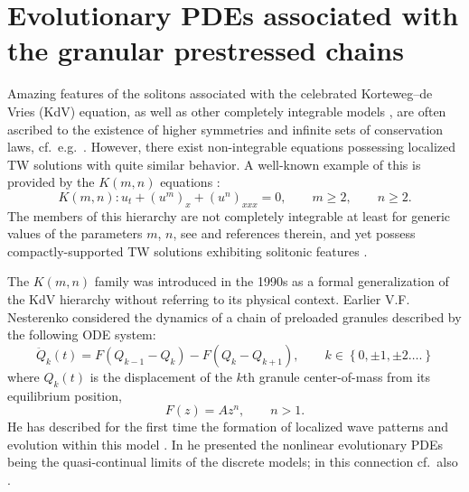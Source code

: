 \documentclass[12pt]{article}
\begin{document}
\section{Evolutionary PDEs associated with the granular prestressed chains}\label{vs:sec2}

Amazing features of the solitons associated with the celebrated Korteweg--de Vries (KdV) equation, as well as other completely integrable  models \cite{Dodd}, are often ascribed to the existence of higher symmetries and infinite sets of conservation laws, cf.\ e.g.\ \cite{Ibragimov, mikshab, Olver}. However, there exist non-integrable equations possessing localized TW solutions with quite similar behavior. A well-known example of this is provided by the $K(m,n)$ equations \cite{Hyman-Rosenau}:
\begin{equation}\label{Kmn}
K(m, n): u_t+\left( u^m \right)_x+ \left(u^n\right)_{xxx}=0, \qquad m\geq 2,\qquad n\geq 2.
\end{equation}
The members of this hierarchy are not completely integrable at least for generic values of the parameters $m$, $n$, see \cite{RosenauKmn, Vodova} and references therein, and yet possess compactly-supported TW solutions exhibiting solitonic features \cite{Hyman-Rosenau, frutos}.


The $K(m, n)$ family was introduced in the 1990s as a formal generalization of the KdV hierarchy without referring to its physical context. Earlier V.F. Nesterenko \cite{Nester_83} considered the dynamics of a chain of preloaded granules described by the following ODE system:
\begin{equation}\label{DS_Nest}
\ddot Q_k(t)=F(Q_{k-1}-Q_{k})-F(Q_{k}-Q_{k+1}),   \qquad       k \in \left \{0, \pm 1, \pm 2\dots.   \right\}
\end{equation}
where
$Q_k(t)$ is the displacement of the $k$th granule center-of-mass from its equilibrium position,
\begin{equation}\label{force}
F(z)=A z^n, \qquad n>1.
\end{equation}
He has described for the first time the formation of localized wave patterns and evolution within this model \cite{Nester_83, Nester_94, NestLaz_85}. In \cite{Nester_83, Nester_94, Nester_02} he presented
the nonlinear evolutionary PDEs being the quasi-continual limits of the discrete models; in this connection cf.\
also \cite{nester_18}.
\end{document}
